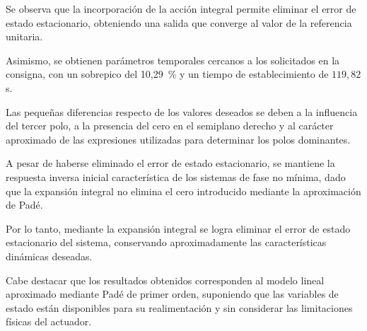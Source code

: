 \documentclass[10pt]{article}
\begin{document}
Se observa que la incorporación de la acción integral
permite eliminar el error de estado estacionario,
obteniendo una salida que converge al valor de la
referencia unitaria.

Asimismo, se obtienen parámetros temporales cercanos
a los solicitados en la consigna, con un sobrepico
del 10,29~\% y un tiempo de establecimiento de
$119{,}82$ s.

Las pequeñas diferencias respecto de los valores
deseados se deben a la influencia del tercer polo,
a la presencia del cero en el semiplano derecho
y al carácter aproximado de las expresiones utilizadas
para determinar los polos dominantes.

A pesar de haberse eliminado el error de estado
estacionario, se mantiene la respuesta inversa
inicial característica de los sistemas de fase
no mínima, dado que la expansión integral no
elimina el cero introducido mediante la aproximación
de Padé.

Por lo tanto, mediante la expansión integral se logra
eliminar el error de estado estacionario del sistema,
conservando aproximadamente las características
dinámicas deseadas.

Cabe destacar que los resultados obtenidos corresponden
al modelo lineal aproximado mediante Padé de primer
orden, suponiendo que las variables de estado están
disponibles para su realimentación y sin considerar
las limitaciones físicas del actuador.
\end{document}
